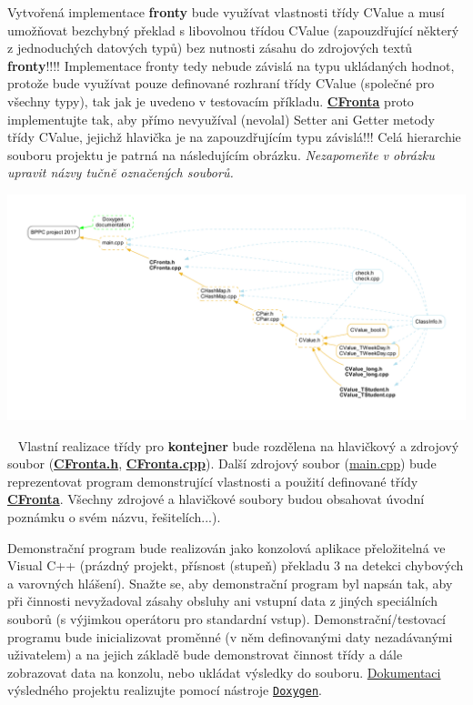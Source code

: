 Vytvořená implementace {\bfseries fronty} bude využívat vlastnosti třídy {\ttfamily C\+Value} a musí umožňovat bezchybný překlad s libovolnou třídou {\ttfamily C\+Value} (zapouzdřující některý z jednoduchých datových typů) bez nutnosti zásahu do zdrojových textů {\bfseries fronty}!!!! Implementace fronty tedy nebude závislá na typu ukládaných hodnot, protože bude využívat pouze definované rozhraní třídy {\ttfamily C\+Value} (společné pro všechny typy), tak jak je uvedeno v testovacím příkladu. {\bfseries \hyperlink{class_c_fronta}{C\+Fronta}} proto implementujte tak, aby přímo nevyužíval (nevolal) Setter ani Getter metody třídy {\ttfamily C\+Value}, jejichž hlavička je na zapouzdřujícím typu závislá!!! Celá hierarchie souboru projektu je patrná na následujícím obrázku. {\itshape Nezapomeňte v obrázku upravit názvy tučně označených souborů.} 
\begin{DoxyImage}
\includegraphics[width=\textwidth,height=\textheight/2,keepaspectratio=true]{dot_project_hierarchy}
\end{DoxyImage}
~\newline
 Vlastní realizace třídy pro {\bfseries kontejner} bude rozdělena na hlavičkový a zdrojový soubor ({\bfseries \hyperlink{_c_fronta_8h}{C\+Fronta.\+h}}, {\bfseries \hyperlink{_c_fronta_8cpp}{C\+Fronta.\+cpp}}). Další zdrojový soubor (\hyperlink{main_8cpp}{main.\+cpp}) bude reprezentovat program demonstrující vlastnosti a použití definované třídy {\bfseries \hyperlink{class_c_fronta}{C\+Fronta}}. Všechny zdrojové a hlavičkové soubory budou obsahovat úvodní poznámku o svém názvu, řešitelích...).

Demonstrační program bude realizován jako konzolová aplikace přeložitelná ve Visual C++ (prázdný projekt, přísnost (stupeň) překladu 3 na detekci chybových a varovných hlášení). Snažte se, aby demonstrační program byl napsán tak, aby při činnosti nevyžadoval zásahy obsluhy ani vstupní data z jiných speciálních souborů (s výjimkou operátoru pro standardní vstup). Demonstrační/testovací programu bude inicializovat proměnné (v něm definovanými daty nezadávanými uživatelem) a na jejich základě bude demonstrovat činnost třídy a dále zobrazovat data na konzolu, nebo ukládat výsledky do souboru. \hyperlink{doc}{Dokumentaci} výsledného projektu realizujte pomocí nástroje \href{http://www.doxygen.org}{\tt Doxygen}.

